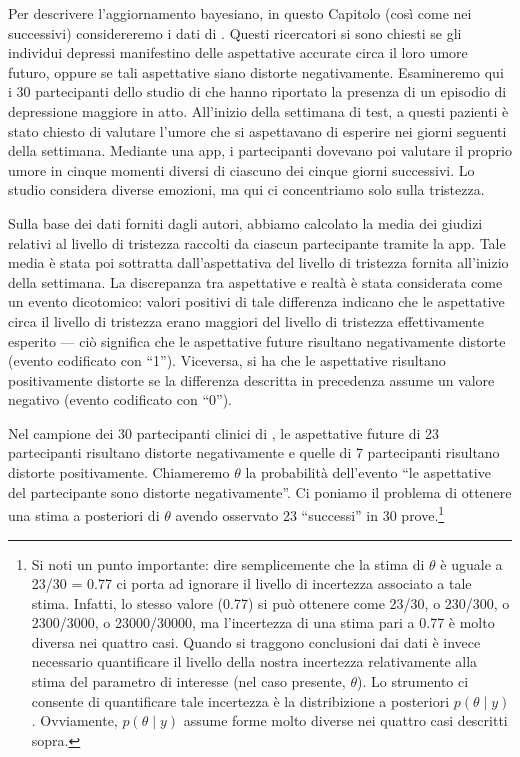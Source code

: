 \documentclass[
  10pt,
  italian,
  a4paper,
  extrafontsizes,onecolumn,openright
  ]{memoir}
\theoremstyle{definition}
\theoremstyle{definition}
\theoremstyle{definition}
\theoremstyle{definition}
\theoremstyle{remark}
\begin{document}
Per descrivere l'aggiornamento bayesiano, in questo Capitolo (così come nei successivi) considereremo i dati di \textcite{zetschefuture2019}. Questi ricercatori si sono chiesti se gli individui depressi manifestino delle aspettative accurate circa il loro umore futuro, oppure se tali aspettative siano distorte negativamente. Esamineremo qui i 30 partecipanti dello studio di \textcite{zetschefuture2019} che hanno riportato la presenza di un episodio di depressione maggiore in atto. All'inizio della settimana di test, a questi pazienti è stato chiesto di valutare l'umore che si aspettavano di esperire nei giorni seguenti della settimana. Mediante una app, i partecipanti dovevano poi valutare il proprio umore in cinque momenti diversi di ciascuno dei cinque giorni successivi. Lo studio considera diverse emozioni, ma qui ci concentriamo solo sulla tristezza.

Sulla base dei dati forniti dagli autori, abbiamo calcolato la media dei giudizi relativi al livello di tristezza raccolti da ciascun partecipante tramite la app. Tale media è stata poi sottratta dall'aspettativa del livello di tristezza fornita all'inizio della settimana. La discrepanza tra aspettative e realtà è stata considerata come un evento dicotomico: valori positivi di tale differenza indicano che le aspettative circa il livello di tristezza erano maggiori del livello di tristezza effettivamente esperito --- ciò significa che le aspettative future risultano negativamente distorte (evento codificato con ``1''). Viceversa, si ha che le aspettative risultano positivamente distorte se la differenza descritta in precedenza assume un valore negativo (evento codificato con ``0'').

Nel campione dei 30 partecipanti clinici di \textcite{zetschefuture2019}, le aspettative future di 23 partecipanti risultano distorte negativamente e quelle di 7 partecipanti risultano distorte positivamente. Chiameremo \(\theta\) la probabilità dell'evento ``le aspettative del partecipante sono distorte negativamente''. Ci poniamo il problema di ottenere una stima a posteriori di \(\theta\) avendo osservato 23 ``successi'' in 30 prove.\footnote{Si noti un punto importante: dire semplicemente che la stima di \(\theta\) è uguale a 23/30 = 0.77 ci porta ad ignorare il livello di incertezza associato a tale stima. Infatti, lo stesso valore (0.77) si può ottenere come 23/30, o 230/300, o 2300/3000, o 23000/30000, ma l'incertezza di una stima pari a 0.77 è molto diversa nei quattro casi. Quando si traggono conclusioni dai dati è invece necessario quantificare il livello della nostra incertezza relativamente alla stima del parametro di interesse (nel caso presente, \(\theta\)). Lo strumento ci consente di quantificare tale incertezza è la distribizione a posteriori \(p(\theta \mid y)\). Ovviamente, \(p(\theta \mid y)\) assume forme molto diverse nei quattro casi descritti sopra.}
\end{document}
